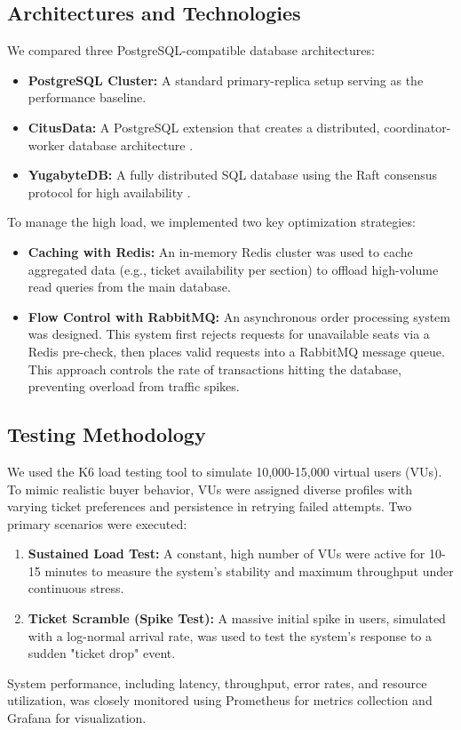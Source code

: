\documentclass[a0,landscape]{config/poster/a0poster}
\begin{document}
\begin{multicols}{4}
    \subsection*{Architectures and Technologies}
    We compared three PostgreSQL-compatible database architectures:
    \begin{itemize}
        \item \textbf{PostgreSQL Cluster:} A standard primary-replica setup serving as the performance baseline.
        \item \textbf{CitusData:} A PostgreSQL extension that creates a distributed, coordinator-worker database architecture \cite{citus}.
        \item \textbf{YugabyteDB:} A fully distributed SQL database using the Raft consensus protocol for high availability \cite{yugabyte}.
    \end{itemize}

    To manage the high load, we implemented two key optimization strategies:
    \begin{itemize}
        \item \textbf{Caching with Redis:} An in-memory Redis cluster was used to cache aggregated data (e.g., ticket availability per section) to offload high-volume read queries from the main database.
        \item \textbf{Flow Control with RabbitMQ:} An asynchronous order processing system was designed. This system first rejects requests for unavailable seats via a Redis pre-check, then places valid requests into a RabbitMQ message queue. This approach controls the rate of transactions hitting the database, preventing overload from traffic spikes.
    \end{itemize}

    \subsection*{Testing Methodology}
    We used the K6 load testing tool to simulate 10,000-15,000 virtual users (VUs). To mimic realistic buyer behavior, VUs were assigned diverse profiles with varying ticket preferences and persistence in retrying failed attempts. Two primary scenarios were executed:
    \begin{enumerate}
        \item \textbf{Sustained Load Test:} A constant, high number of VUs were active for 10-15 minutes to measure the system's stability and maximum throughput under continuous stress.
        \item \textbf{Ticket Scramble (Spike Test):} A massive initial spike in users, simulated with a log-normal arrival rate, was used to test the system's response to a sudden "ticket drop" event.
    \end{enumerate}
    System performance, including latency, throughput, error rates, and resource utilization, was closely monitored using Prometheus for metrics collection and Grafana for visualization.


\end{multicols}
\end{document}
